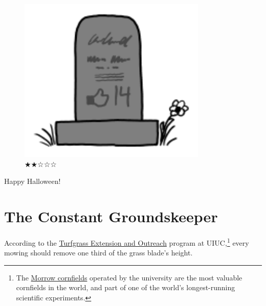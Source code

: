 {\begin{figure}[!htbp]
\centering
\includegraphics[scale=0.5, max width=0.8\textwidth]{imgs/a/69/facebook_grave.png}
\caption{★★☆☆☆}
\end{figure}

{Happy Halloween!}

{
\chapter{The Constant Groundskeeper}
}

\hfill{}

{According to the \href{http://www.turf.uiuc.edu/extension/ext-mow.html}{Turfgrass Extension and Outreach} program at UIUC,{\footnote{The \href{http://admissions.illinois.edu/visit/selfguided/quad.html\#morrow}{Morrow cornfields} operated by the university are the most valuable cornfields in the world, and part of one of the world's longest-running scientific experiments.} } every mowing should remove one third of the grass blade's height.}

}
